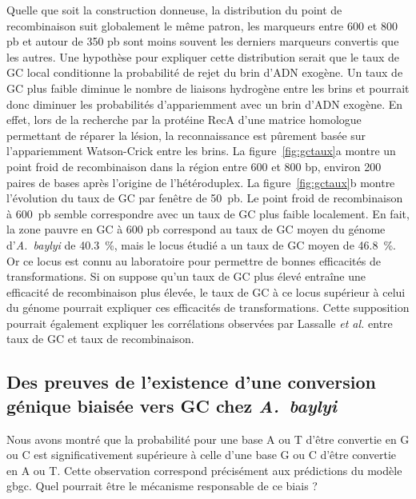 Quelle que soit la construction donneuse, la distribution du point de
recombinaison suit globalement le même patron, les marqueurs entre \num{600} et
\num{800} pb et autour de \num{350} pb sont moins souvent les derniers marqueurs
convertis que les autres. Une hypothèse pour expliquer cette distribution serait
que le taux de GC local conditionne la probabilité de rejet du brin d'ADN
exogène. Un taux de GC plus faible diminue le nombre de liaisons hydrogène entre
les brins et pourrait donc diminuer les probabilités d'appariemment avec un brin
d'ADN exogène. En effet, lors de la recherche par la protéine RecA d'une matrice
homologue permettant de réparer la lésion, la reconnaissance est pûrement basée
sur l'appariemment Watson-Crick entre les brins\cite{lee_base_2015}. La
figure~\ref{fig:gctaux}a montre un point froid de recombinaison dans la région
entre \num{600} et \num{800} bp, environ \num{200} paires de bases après
l'origine de l'hétéroduplex. La figure~\ref{fig:gctaux}b montre l'évolution du
taux de GC par fenêtre de \num{50}~pb. Le point froid de recombinaison à
\num{600}~pb semble correspondre avec un taux de GC plus faible localement. En
fait, la zone pauvre en GC à \num{600} pb correspond au taux de GC moyen du
génome d'\emph{A.~baylyi} de \SI{40.3}{\percent}, mais le locus étudié a un taux
de GC moyen de \SI{46.8}{\percent}. Or ce locus est connu au laboratoire pour
permettre de bonnes efficacités de transformations. Si on suppose qu'un taux de
GC plus élevé entraîne une efficacité de recombinaison plus élevée, le taux de
GC à ce locus supérieur à celui du génome pourrait expliquer ces efficacités de
transformations. Cette supposition pourrait également expliquer les corrélations
observées par Lassalle \emph{et al.}\cite{lassalle_gc-content_2015} entre taux
de GC et taux de recombinaison.

\subsection{Des preuves de l'existence d'une conversion génique biaisée vers GC
  chez \textit{A.~baylyi}}

Nous avons montré que la probabilité pour une base A ou T d'être convertie en G
ou C est significativement supérieure à celle d'une base G ou C d'être convertie
en A ou T. Cette observation correspond précisément aux prédictions du modèle
\ac{gbgc}. Quel pourrait être le mécanisme responsable de ce biais ?


